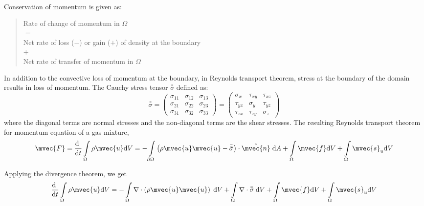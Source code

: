 Conservation of momentum is given as: 
\begin{quote}
	\centering
	Rate of change of momentum in $\Omega$\\
	$=$\\
	Net rate of loss ($-$) or gain ($+$) of density at the boundary\\
	$+$\\
	Net rate of transfer of momentum in $\Omega$
\end{quote}

In addition to the convective loss of momentum at the boundary, in Reynolds transport theorem, stress at the boundary of the domain results in loss of momentum. The Cauchy stress tensor $\bar{\bar{\sigma}}$ defined as:
\begin{equation}
\bar{\bar{\sigma}} = \left( {\begin{array}{*{20}{c}}
	{{\sigma _{11}}}&{{\sigma _{12}}}&{{\sigma _{13}}}\\
	{{\sigma _{21}}}&{{\sigma _{22}}}&{{\sigma _{23}}}\\
	{{\sigma _{31}}}&{{\sigma _{32}}}&{{\sigma _{33}}}
	\end{array}} \right) = \left( {\begin{array}{*{20}{c}}
	{{\sigma _x}}&{{\tau _{xy}}}&{{\tau _{xz}}}\\
	{{\tau _{yx}}}&{{\sigma _y}}&{{\tau _{yz}}}\\
	{{\tau _{zx}}}&{{\tau _{zy}}}&{{\sigma _z}}
	\end{array}} \right)
\end{equation}
where the diagonal terms are normal stresses and the non-diagonal terms are the shear stresses. The resulting Reynolds transport theorem for momentum equation of a gas mixture, 
\begin{equation}
{\mvec{F}} = \frac{\mathrm{d}~}{{\mathrm{d}t}} \int \limits_\Omega  {\rho }{{\mvec{u}}}\mathrm{d}V =  - \int \limits_{\partial\Omega}  \left( \rho \mvec{u}\mvec{u} - \bar{\bar{\sigma}}\right) \cdot \hat{\mvec{n}}\;\mathrm{d}A + \int \limits_\Omega \mvec{f} \mathrm{d}V + \int \limits_\Omega \mvec{s}_{u} \mathrm{d}V
\end{equation}

Applying the divergence theorem, we get
\begin{equation}
\frac{\mathrm{d}~}{{\mathrm{d}t}} \int \limits_\Omega  {\rho }{{\mvec{u}}}\mathrm{d}V =  - \int \limits_{\Omega}  \nabla \cdot \left(\rho \mvec{u} \mvec{u} \right)\; \mathrm{d}V +  \int \limits_\Omega \nabla \cdot \bar{\bar{{\sigma}}}\;\mathrm{d}V + \int \limits_\Omega \mvec{f} \mathrm{d}V + \int \limits_\Omega \mvec{s}_{u} \mathrm{d}V
\end{equation}

